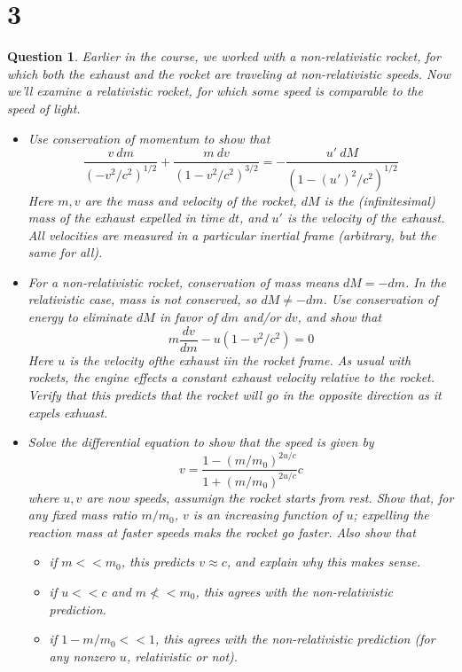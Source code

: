 \documentclass{article}
\newtheorem{question}{Question}
\begin{document}
\section*{3}
\begin{question}\label{q3}
    Earlier in the course, we worked with a non-relativistic rocket, for which both the exhaust and the rocket are traveling at non-relativistic speeds. Now we'll examine a relativistic rocket, for which some speed is comparable to the speed of light.
    \begin{itemize}
        \item[(a)] Use conservation of momentum to show that 
        $$\frac{v\ dm}{(-v^2/c^2)^{1/2}}+\frac{m\ dv}{(1-v^2/c^2)^{3/2}}=-\frac{ u'\ dM}{(1-(u')^2/c^2)^{1/2}}$$
        Here $m,v$ are the mass and velocity of the rocket, $dM$ is the (infinitesimal) mass of the exhaust expelled in time $dt$, and $u'$ is the velocity of the exhaust. All velocities are measured in a particular inertial frame (arbitrary, but the same for all).
        \item[(b)] For a non-relativistic rocket, conservation of mass means $dM=-dm$. In the relativistic case, mass is not conserved, so $dM\neq -dm$. Use conservation of energy to eliminate $dM$ in favor of $dm$ and/or $dv$, and show that 
        $$m\frac{dv}{dm}-u(1-v^2/c^2)=0$$
        Here $u$ is the velocity ofthe exhaust iin the rocket frame. As usual with rockets, the engine effects a constant exhaust velocity relative to the rocket. Verify that this predicts that the rocket will go in the opposite direction as it expels exhuast.
        \item[(c)] Solve the differential equation to show that the speed is given by 
        $$v=\frac{1-(m/m_0)^{2u/c}}{1+(m/m_0)^{2u/c}}c$$
        where $u,v$ are now speeds, assumign the rocket starts from rest. Show that, for any fixed mass ratio $m/m_0$, $v$ is an increasing function of $u$; expelling the reaction mass at faster speeds maks the rocket go faster. Also show that 
        \begin{itemize}
            \item[i.] if $m<<m_0$, this predicts $v\approx c$, and explain why this makes sense.
            \item[ii.] if $u<<c$ and $m\not<<m_0$, this agrees with the non-relativistic prediction.
            \item[iii.] if $1-m/m_0<<1$, this agrees with the non-relativistic prediction (for any nonzero $u$, relativistic or not).  
        \end{itemize}

\end{itemize}
\end{question}
\end{document}
